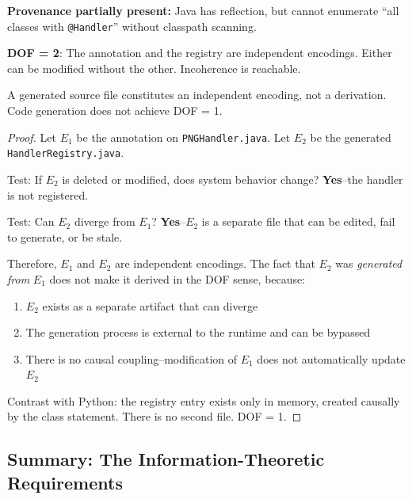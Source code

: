 \textbf{Provenance partially present:} Java has reflection, but cannot enumerate ``all classes with \texttt{@Handler}'' without classpath scanning.

\textbf{DOF = 2}: The annotation and the registry are independent encodings. Either can be modified without the other. Incoherence is reachable.

\begin{theorem}\label{thm:generated-second}
A generated source file constitutes an independent encoding, not a derivation. Code generation does not achieve DOF = 1.
\end{theorem}

\begin{proof}
Let $E_1$ be the annotation on \texttt{PNGHandler.java}. Let $E_2$ be the generated \texttt{HandlerRegistry.java}.

Test: If $E_2$ is deleted or modified, does system behavior change? \textbf{Yes}--the handler is not registered.

Test: Can $E_2$ diverge from $E_1$? \textbf{Yes}--$E_2$ is a separate file that can be edited, fail to generate, or be stale.

Therefore, $E_1$ and $E_2$ are independent encodings. The fact that $E_2$ was \emph{generated from} $E_1$ does not make it derived in the DOF sense, because:
\begin{enumerate}
\tightlist
\item $E_2$ exists as a separate artifact that can diverge
\item The generation process is external to the runtime and can be bypassed
\item There is no causal coupling--modification of $E_1$ does not automatically update $E_2$
\end{enumerate}

Contrast with Python: the registry entry exists only in memory, created causally by the class statement. There is no second file. DOF = 1.
\end{proof}

\subsection{Summary: The Information-Theoretic Requirements}\label{sec:req-summary}


